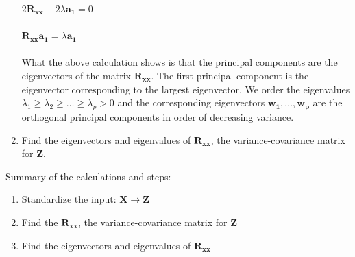 \documentclass{article}
\begin{document}
\begin{enumerate}
$
2\boldsymbol{R_{xx}} - 2\lambda \boldsymbol{a_1} = 0
$\\\\

$
\boldsymbol{R_{xx}a_1} = \lambda \boldsymbol{a_1}
$
\\\\
What the above calculation shows is that the principal components are the eigenvectors of the matrix $\boldsymbol{R_{xx}}$. The first principal component is the eigenvector corresponding to the largest eigenvector. We order the eigenvalues $\lambda_1 \geq \lambda_2 \geq \ldots \geq \lambda_p > 0$ and the corresponding eigenvectors $\boldsymbol{w_1}, \ldots, \boldsymbol{w_p}$ are the orthogonal principal components in order of decreasing variance.

\item Find the eigenvectors and eigenvalues of $\boldsymbol{R_{xx}}$, the variance-covariance matrix for $\boldsymbol{Z}$.
\end{enumerate}

Summary of the calculations and steps:
\begin{enumerate}
    \item Standardize the input: $\boldsymbol{X} \rightarrow \boldsymbol{Z}$
    \item Find the $\boldsymbol{R_{xx}}$, the variance-covariance matrix for $\boldsymbol{Z}$
    \item Find the eigenvectors and eigenvalues of $\boldsymbol{R_{xx}}$
\end{enumerate}
\end{document}
